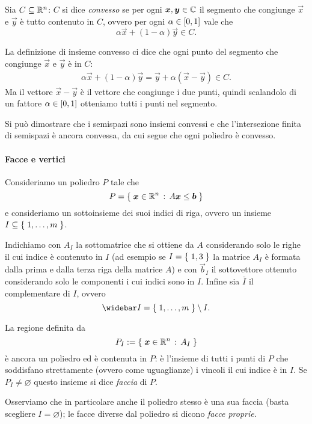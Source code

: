 \begin{definition}
    Sia $C \subseteq \R^n$: $C$ si dice \emph{convesso} se per ogni $\vec x, \vec y \in \C$ il segmento che congiunge $\vec x$ e $\vec y$ è tutto contenuto in $C$, ovvero per ogni $\alpha \in \closedInt*{0, 1}$ vale che \[
        \alpha\vec x + (1 - \alpha)\vec y \in C.    
    \]
\end{definition}

La definizione di insieme convesso ci dice che ogni punto del segmento che congiunge $\vec x$ e $\vec y$ è in $C$: \begin{align*}
    \alpha\vec x + (1 - \alpha)\vec y = \vec y + \alpha(\vec x - \vec y) \in C.
\end{align*} Ma il vettore $\vec x - \vec y$ è il vettore che congiunge i due punti, quindi scalandolo di un fattore $\alpha \in \closedInt*{0, 1}$ otteniamo tutti i punti nel segmento.

Si può dimostrare che i semispazi sono insiemi convessi e che l'intersezione finita di semispazi è ancora convessa, da cui segue che ogni poliedro è convesso.

\paragraph{Facce e vertici} Consideriamo un poliedro $P$ tale che \[
    P = \set{\vec x \in \R^n \suchthat A\vec x \leq \vec b}    
\] e consideriamo un sottoinsieme dei suoi indici di riga, ovvero un insieme $I \subseteq \set{1, \dots, m}$.

Indichiamo con $A_I$ la sottomatrice che si ottiene da $A$ considerando solo le righe il cui indice è contenuto in $I$ (ad esempio se $I = \set{1, 3}$ la matrice $A_I$ è formata dalla prima e dalla terza riga della matrice $A$) e con $\vec b_I$ il sottovettore ottenuto considerando solo le componenti i cui indici sono in $I$. Infine sia $\bar I$ il complementare di $I$, ovvero \[
    \bar I = \set{1, \dots, m} \setminus I.    
\]

La regione definita da \[
    P_I \deq \set{\vec x \in \R^n \suchthat A_I}    
\] è ancora un poliedro ed è contenuta in $P$: è l'insieme di tutti i punti di $P$ che soddisfano strettamente (ovvero come uguaglianze) i vincoli il cui indice è in $I$. Se $P_I \neq \varnothing$ questo insieme si dice \emph{faccia} di $P$.

Osserviamo che in particolare anche il poliedro stesso è una sua faccia (basta scegliere $I = \varnothing$); le facce diverse dal poliedro si dicono \emph{facce proprie}.

